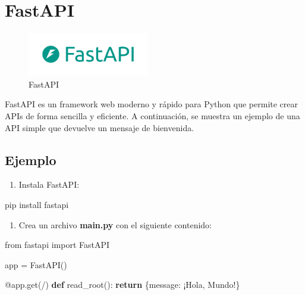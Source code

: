 \documentclass[
  a4paper,
  DIV=11,
  numbers=noendperiod,
  onepage,
  openany]{scrreprt}
\newenvironment{Shaded}{\begin{snugshade}}{\end{snugshade}}
\newcommand{\AttributeTok}[1]{\textcolor[rgb]{0.40,0.45,0.13}{#1}}
\newcommand{\ControlFlowTok}[1]{\textcolor[rgb]{0.00,0.23,0.31}{\textbf{#1}}}
\newcommand{\ExtensionTok}[1]{\textcolor[rgb]{0.00,0.23,0.31}{#1}}
\newcommand{\ImportTok}[1]{\textcolor[rgb]{0.00,0.46,0.62}{#1}}
\newcommand{\KeywordTok}[1]{\textcolor[rgb]{0.00,0.23,0.31}{\textbf{#1}}}
\newcommand{\NormalTok}[1]{\textcolor[rgb]{0.00,0.23,0.31}{#1}}
\newcommand{\OperatorTok}[1]{\textcolor[rgb]{0.37,0.37,0.37}{#1}}
\newcommand{\StringTok}[1]{\textcolor[rgb]{0.13,0.47,0.30}{#1}}
\providecommand{\tightlist}{%
  \setlength{\itemsep}{0pt}\setlength{\parskip}{0pt}}\usepackage{longtable,booktabs,array}
\begin{document}
\section{FastAPI}\label{fastapi}

\begin{figure}[H]

{\centering \includegraphics[width=2.08333in,height=\textheight,keepaspectratio]{unidades/unidad7/./images/fastapi_logo.png}

}

\caption{FastAPI}

\end{figure}%

FastAPI es un framework web moderno y rápido para Python que permite
crear APIs de forma sencilla y eficiente. A continuación, se muestra un
ejemplo de una API simple que devuelve un mensaje de bienvenida.

\subsection{Ejemplo}\label{ejemplo-3}

\begin{enumerate}
\def\labelenumi{\arabic{enumi}.}
\tightlist
\item
  Instala FastAPI:
\end{enumerate}

\begin{Shaded}
\begin{Highlighting}[]
\ExtensionTok{pip}\NormalTok{ install fastapi}
\end{Highlighting}
\end{Shaded}

\begin{enumerate}
\def\labelenumi{\arabic{enumi}.}
\setcounter{enumi}{1}
\tightlist
\item
  Crea un archivo \textbf{main.py} con el siguiente contenido:
\end{enumerate}

\begin{Shaded}
\begin{Highlighting}[]
\ImportTok{from}\NormalTok{ fastapi }\ImportTok{import}\NormalTok{ FastAPI}

\NormalTok{app }\OperatorTok{=}\NormalTok{ FastAPI()}

\AttributeTok{@app.get}\NormalTok{(}\StringTok{\textquotesingle{}/\textquotesingle{}}\NormalTok{)}
\KeywordTok{def}\NormalTok{ read\_root():}
    \ControlFlowTok{return}\NormalTok{ \{}\StringTok{\textquotesingle{}message\textquotesingle{}}\NormalTok{: }\StringTok{\textquotesingle{}¡Hola, Mundo!\textquotesingle{}}\NormalTok{\}}
\end{Highlighting}
\end{Shaded}
\end{document}

